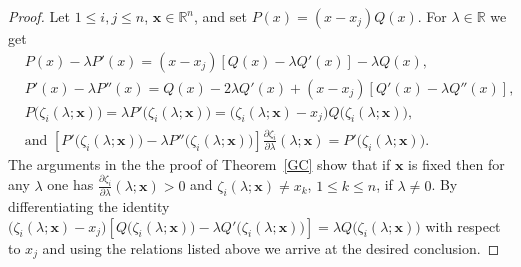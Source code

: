 \documentclass[10pt,twoside,a4paper,reqno]{amsart}
\theoremstyle{plain}
\theoremstyle{definition}
\theoremstyle{remark}
\newcommand {\bR} {\mathbb {R}}
\newcommand {\bx} {\mathbf {x}}
\newcommand {\ze} {\zeta}
\newcommand {\la} {\lambda}
\begin{document}
\begin{proof}
Let $1\le i,j\le n$, $\bx\in \bR^n$, and set $P(x)=(x-x_j)Q(x)$. For 
$\la\in \bR$ we get
\begin{equation*}
\begin{split}
& P(x)-\la P'(x)=(x-x_j)\left[Q(x)-\la Q'(x)\right]-\la Q(x),\\
& P'(x)-\la P''(x)
=Q(x)-2\la Q'(x)+(x-x_j)\left[Q'(x)-\la Q''(x)\right],\\
& P\big(\ze_{i}(\la;\bx)\big)=\la P'\big(\ze_{i}(\la;\bx)\big)
=\big(\ze_{i}(\la;\bx)-x_j\big)Q\big(\ze_{i}(\la;\bx)\big),\\
& \text{and }\!\left[P'\big(\ze_{i}(\la;\bx)\big)-
\la P''\big(\ze_{i}(\la;\bx)\big)\right]
\frac{\partial \ze_i}{\partial \la}(\la;\bx)=P'\big(\ze_{i}(\la;\bx)\big).
\end{split}
\end{equation*}
The arguments in the the proof of Theorem~\ref{GC} show that
if $\bx$ is fixed then for any $\la$ one has
$\frac{\partial \ze_i}{\partial \la}(\la;\bx)>0$ and $\ze_{i}(\la;\bx)\neq 
x_k$, $1\le k\le n$, if $\la\neq 0$. By 
differentiating the identity
$\big(\ze_{i}(\la;\bx)-x_j\big)
\left[Q\big(\ze_{i}(\la;\bx)\big)-\la Q'\big(\ze_{i}(\la;\bx)\big)\right]
=\la Q\big(\ze_{i}(\la;\bx)\big)$ with respect to $x_j$ 
and using the relations listed above we arrive at the desired conclusion.
\end{proof}
\end{document}
